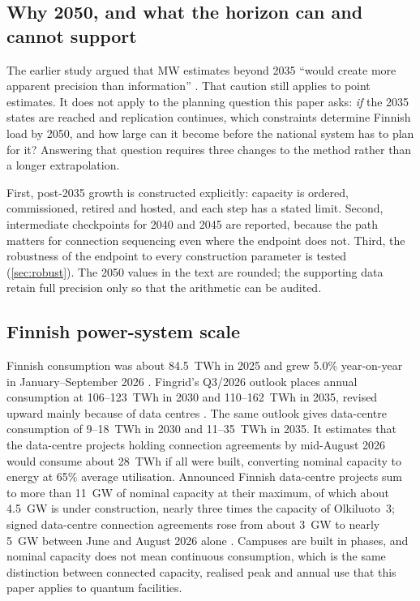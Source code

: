 \documentclass[11pt,a4paper]{article}
\begin{document}
\subsection{Why 2050, and what the horizon can and cannot support}
The earlier study argued that MW estimates beyond 2035 ``would create more apparent precision than information'' \citep{merilehto2026qc2035}. That caution still applies to point estimates. It does not apply to the planning question this paper asks: \emph{if} the 2035 states are reached and replication continues, which constraints determine Finnish load by 2050, and how large can it become before the national system has to plan for it? Answering that question requires three changes to the method rather than a longer extrapolation.

First, post-2035 growth is constructed explicitly: capacity is ordered, commissioned, retired and hosted, and each step has a stated limit. Second, intermediate checkpoints for 2040 and 2045 are reported, because the path matters for connection sequencing even where the endpoint does not. Third, the robustness of the endpoint to every construction parameter is tested (\cref{sec:robust}). The 2050 values in the text are rounded; the supporting data retain full precision only so that the arithmetic can be audited.

\subsection{Finnish power-system scale}\label{sec:scale}
Finnish consumption was about 84.5~TWh in 2025 and grew 5.0\% year-on-year in January--September 2026 \citep{fingrid2026q3}. Fingrid's Q3/2026 outlook places annual consumption at 106--123~TWh in 2030 and 110--162~TWh in 2035, revised upward mainly because of data centres \citep{fingrid2026prospects}. The same outlook gives data-centre consumption of 9--18~TWh in 2030 and 11--35~TWh in 2035. It estimates that the data-centre projects holding connection agreements by mid-August 2026 would consume about 28~TWh if all were built, converting nominal capacity to energy at 65\% average utilisation. Announced Finnish data-centre projects sum to more than 11~GW of nominal capacity at their maximum, of which about 4.5~GW is under construction, nearly three times the capacity of Olkiluoto~3; signed data-centre connection agreements rose from about 3~GW to nearly 5~GW between June and August 2026 alone \citep{merilehto2026blog}. Campuses are built in phases, and nominal capacity does not mean continuous consumption, which is the same distinction between connected capacity, realised peak and annual use that this paper applies to quantum facilities.
\end{document}
